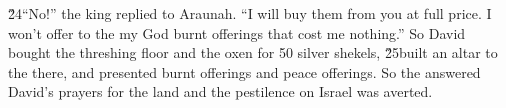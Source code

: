 \v{24}``No!'' the king replied to Araunah. ``I will buy them from you at full price. I won't offer to the  my God burnt offerings that cost me nothing.'' So David bought the threshing floor and the oxen for 50 silver shekels, \v{25}built an altar to the  there, and presented burnt offerings and peace offerings. So the  answered David's prayers for the land and the pestilence on Israel was averted.
